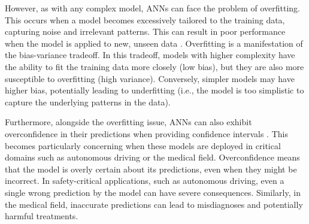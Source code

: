 However, as with any complex model, ANNs can face the problem of overfitting. This occurs when a model becomes excessively tailored to the training data, capturing noise and irrelevant patterns. This can result in poor performance when the model is applied to new, unseen data \cite{James2013}.
Overfitting is a manifestation of the bias-variance tradeoff. In this tradeoff, models with higher complexity have the ability to fit the training data more closely (low bias), but they are also more susceptible to overfitting (high variance). Conversely, simpler models may have higher bias, potentially leading to underfitting (i.e., the model is too simplistic to capture the underlying patterns in the data).

Furthermore, alongside the overfitting issue, ANNs can also exhibit overconfidence in their predictions when providing confidence intervals \cite{9756596}. This becomes particularly concerning when these models are deployed in critical domains such as autonomous driving or the medical field.
Overconfidence means that the model is overly certain about its predictions, even when they might be incorrect. In safety-critical applications, such as autonomous driving, even a single wrong prediction by the model can have severe consequences. Similarly, in the medical field, inaccurate predictions can lead to misdiagnoses and potentially harmful treatments.